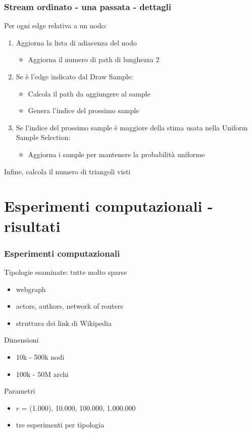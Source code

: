 \documentclass{beamer}
\begin{document}
\begin{frame}
\frametitle{Stream ordinato - una passata - dettagli}

Per ogni edge relativa a un nodo:

\begin{enumerate}
    \item 
Aggiorna la lista di adiacenza del nodo
        \begin{itemize}
            \item 
Aggiorna il numero di path di lunghezza 2
        \end{itemize}
    \item 
Se è l'edge indicato dal Draw Sample:
        \begin{itemize}
            \item 
Calcola il path da aggiungere al sample
            \item 
Genera l'indice del prossimo sample
        \end{itemize}
    \item 
Se l'indice del prossimo sample è maggiore della stima usata nella Uniform Sample Selection:
        \begin{itemize}
            \item 
Aggiorna i sample per mantenere la probabilità uniforme
        \end{itemize}
\end{enumerate}

Infine, calcola il numero di triangoli visti

\end{frame}

\section{Esperimenti computazionali - risultati}

\begin{frame}
\frametitle{Esperimenti computazionali}

Tipologie esaminate: tutte molto sparse
\begin{itemize}
    \item webgraph
    \item actors, authors, network of routers
    \item struttura dei link di Wikipedia
\end{itemize}

Dimensioni
\begin{itemize}
    \item 10k - 500k nodi
    \item 100k - 50M archi
\end{itemize}

Parametri
\begin{itemize}
    \item $r$ = (1.000), 10.000, 100.000, 1.000.000
    \item tre esperimenti per tipologia
\end{itemize}

\end{frame}
\end{document}
